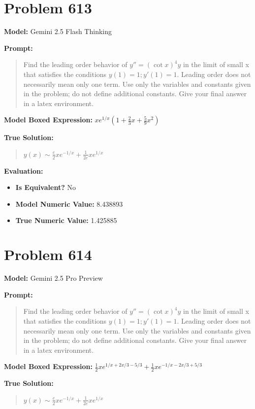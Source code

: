 \documentclass{article}
\begin{document}
\section*{Problem 613}
\textbf{Model:} Gemini 2.5 Flash Thinking

\textbf{Prompt:}
\begin{quote}
Find the leading order behavior of $y''=(\cot x)^4 y$ in the limit of small x that satisfies the conditions $y(1) = 1; y'(1) = 1$. Leading order does not necessarily mean only one term. Use only the variables and constants given in the problem; do not define additional constants. Give your final answer in a \boxed latex environment.
\end{quote}
\textbf{Model Boxed Expression:} $x e^{1/x} \left(1 + \frac{2}{3}x + \frac{5}{9}x^2\right)$

\textbf{True Solution:}
\begin{quote}
$y(x) \sim \frac{e}{2} x e^{-1/x} + \frac{1}{2e} x e^{1/x}$
\end{quote}

\textbf{Evaluation:}
\begin{itemize}
\item \textbf{Is Equivalent?} No
\item \textbf{Model Numeric Value:} 8.438893
\item \textbf{True Numeric Value:} 1.425885
\end{itemize}
\vspace{1cm}
\section*{Problem 614}
\textbf{Model:} Gemini 2.5 Pro Preview

\textbf{Prompt:}
\begin{quote}
Find the leading order behavior of $y''=(\cot x)^4 y$ in the limit of small x that satisfies the conditions $y(1) = 1; y'(1) = 1$. Leading order does not necessarily mean only one term. Use only the variables and constants given in the problem; do not define additional constants. Give your final answer in a \boxed latex environment.
\end{quote}
\textbf{Model Boxed Expression:} $\frac{1}{2}x e^{1/x+2x/3-5/3} + \frac{1}{2}x e^{-1/x-2x/3+5/3}$

\textbf{True Solution:}
\begin{quote}
$y(x) \sim \frac{e}{2} x e^{-1/x} + \frac{1}{2e} x e^{1/x}$
\end{quote}
\end{document}

